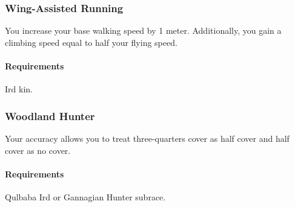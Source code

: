     \subsubsection{Wing-Assisted Running} \label{feat::wingassistedrunning}
        You increase your base walking speed by 1 meter.
        Additionally, you gain a climbing speed equal to half your flying speed.
        \paragraph{Requirements} Ird kin.
    \subsubsection{Woodland Hunter} \label{feat::woodlandhunter}
        Your accuracy allows you to treat three-quarters cover as half cover and half cover as no cover.
        \paragraph{Requirements} Qulbaba Ird or Gannagian Hunter subrace.

\newpage~\newpage
